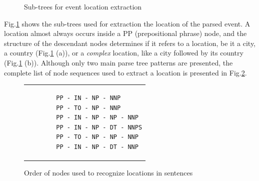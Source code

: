 \documentclass{llncs}
\begin{document}
\begin{figure}[h!]
	\centering
	\hspace{20mm}
	\caption{Sub-trees for event location extraction}
	\label{fig:location-extraction}
\end{figure}

Fig.\ref{fig:location-extraction} shows the sub-trees used for extraction the location of the parsed event. A location almost always occurs inside a PP (prepositional phrase) node, and the structure of the descendant nodes determines if it refers to a location, be it a city, a country (Fig.\ref{fig:location-extraction} (a)), or a \textit{complex} location, like a city followed by its country (Fig.\ref{fig:location-extraction} (b)). Although only two main parse tree patterns are presented, the complete list of node sequences used to extract a location is presented in Fig.\ref{fig:nodes-order}.

\begin{figure}[h!]
	\centering
	\begin{tabular}{p{4cm}}
		\begin{verbatim}
		PP - IN - NP - NNP
		PP - TO - NP - NNP
		PP - IN - NP - NP - NNP
		PP - IN - NP - DT - NNPS
		PP - TO - NP - NP - NNP
		PP - IN - NP - DT - NNP
		\end{verbatim}
	\end{tabular}
	\caption{Order of nodes used to recognize locations in sentences}
	\label{fig:nodes-order}
\end{figure}
\end{document}
